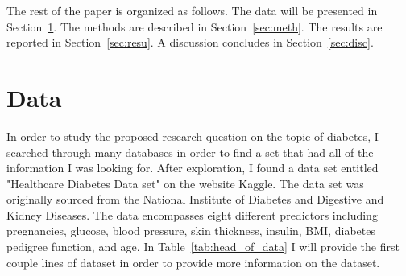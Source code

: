 \documentclass[12pt]{article}
\begin{document}
    The rest of the paper is organized as follows.
    The data will be presented in Section~\ref{sec:data}.
    The methods are described in Section~\ref{sec:meth}.
    The results are reported in Section~\ref{sec:resu}.
    A discussion concludes in Section~\ref{sec:disc}.

\section{Data}
\label{sec:data}
    In order to study the proposed research question on the topic of diabetes, I searched through many databases in order to find a set 
    that had all of the information I was looking for. After exploration, I found a data set entitled "Healthcare Diabetes Data set" on 
    the website Kaggle. The data set was originally sourced from the National Institute of Diabetes and Digestive and Kidney Diseases. The 
    data encompasses eight different predictors including pregnancies, glucose, blood pressure, skin thickness, insulin, BMI, diabetes 
    pedigree function, and age. In Table~\ref{tab:head_of_data} I will provide the first couple lines of dataset in order to provide
    more information on the dataset.

    \begin{table}[ht]
    \caption{Head of the Dataset}
    \centering
    \label{tab:head_of_data}
    \end{table}
    
\end{document}
